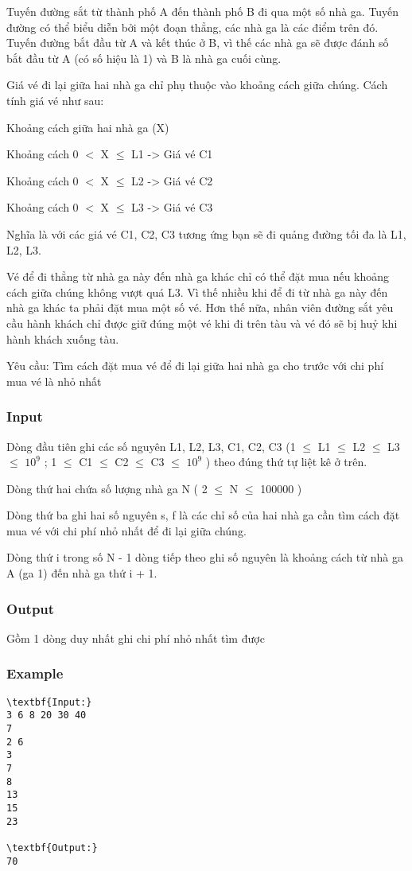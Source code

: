 



   Tuyến đường sắt từ thành phố A đến thành phố B đi qua một số nhà ga. Tuyến đường có thể biểu diễn bởi một đoạn thẳng, các nhà ga là các điểm trên đó. Tuyến đường bắt đầu từ A và kết thúc ở B, vì thế các nhà ga sẽ được đánh số bắt đầu từ A (có số hiệu là 1) và B là nhà ga cuối cùng.  

   Giá vé đi lại giữa hai nhà ga chỉ phụ thuộc vào khoảng cách giữa chúng. Cách tính giá vé như sau:  

   Khoảng cách giữa hai nhà ga (X)  

   Khoảng cách 0 $<$ X  $\le$  L1      -> Giá vé              C1  

   Khoảng cách 0 $<$ X  $\le$  L2     -> Giá vé              C2  

   Khoảng cách 0 $<$ X  $\le$  L3     -> Giá vé              C3  

   Nghĩa là với các giá vé C1, C2, C3 tương ứng bạn sẽ đi quảng đường tối đa là L1, L2, L3.  

   Vé để đi thẳng từ nhà ga này đến nhà ga khác chỉ có thể đặt mua nếu khoảng cách giữa chúng không vượt quá L3. Vì thế nhiều khi để đi từ nhà ga này đến nhà ga khác ta phải đặt mua một số vé. Hơn thế nữa, nhân viên đường sắt yêu cầu hành khách chỉ được giữ đúng một vé khi đi trên tàu và vé đó sẽ bị huỷ khi hành khách xuống tàu.  

   Yêu cầu: Tìm cách đặt mua vé để đi lại giữa hai nhà ga cho trước với chi phí mua vé là nhỏ nhất  

\subsubsection{   Input  }

   Dòng đầu tiên ghi các số nguyên L1, L2, L3, C1, C2, C3 (1  $\le$  L1  $\le$  L2  $\le$  L3  $\le$  $10^{9}$   ;  1  $\le$  C1  $\le$  C2  $\le$  C3  $\le$  $10^{9}$   ) theo đúng thứ tự liệt kê ở trên.  

   Dòng thứ hai chứa số lượng nhà ga N ( 2  $\le$  N  $\le$  100000 )  

   Dòng thứ ba ghi hai số nguyên s, f là các chỉ số của hai nhà ga cần tìm cách đặt mua vé với chi phí nhỏ nhất để đi lại giữa chúng.  

   Dòng thứ i trong số N - 1 dòng tiếp theo ghi số nguyên là khoảng cách từ nhà ga A (ga 1) đến nhà ga thứ i + 1.  

\subsubsection{   Output  }

   Gồm 1 dòng duy nhất ghi chi phí nhỏ nhất tìm được  

\subsubsection{   Example  }
\begin{verbatim}
\textbf{Input:}
3 6 8 20 30 40
7
2 6
3
7
8
13
15
23

\textbf{Output:}
70
\end{verbatim}
